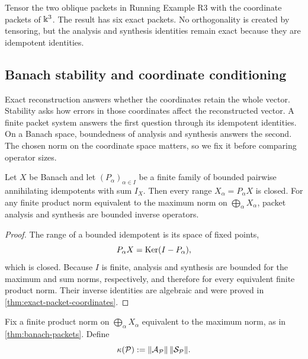 \begin{microexample}[title={Tensoring the oblique packet split}]
Tensor the two oblique packets in Running Example R3 with the coordinate packets of \(\Bbbk^3\).  The result has six exact packets.  No orthogonality is created by tensoring, but the analysis and synthesis identities remain exact because they are idempotent identities.
\end{microexample}

\subsection{Banach stability and coordinate conditioning}
Exact reconstruction answers whether the coordinates retain the whole vector.  Stability asks how errors in those coordinates affect the reconstructed vector.  A finite packet system answers the first question through its idempotent identities.  On a Banach space, boundedness of analysis and synthesis answers the second.  The chosen norm on the coordinate space matters, so we fix it before comparing operator sizes.

\begin{theorem}
\label{thm:banach-packets}
Let $X$ be Banach and let $(P_\alpha)_{\alpha\in I}$ be a finite family of bounded pairwise annihilating idempotents with sum $I_X$.  Then every range $X_\alpha=P_\alpha X$ is closed.  For any finite product norm equivalent to the maximum norm on $\bigoplus_\alpha X_\alpha$, packet analysis and synthesis are bounded inverse operators.
\end{theorem}

\begin{proof}
The range of a bounded idempotent is its space of fixed points,
\[
P_\alpha X=\operatorname{Ker}(I-P_\alpha),
\]
which is closed.  Because $I$ is finite, analysis and synthesis are bounded for the maximum and sum norms, respectively, and therefore for every equivalent finite product norm.  Their inverse identities are algebraic and were proved in \cref{thm:exact-packet-coordinates}.
\end{proof}

\begin{definition}
\label{def:packet-condition-number}
Fix a finite product norm on $\bigoplus_\alpha X_\alpha$ equivalent to the maximum norm, as in \cref{thm:banach-packets}. Define
\[
\kappa(\mathcal P):=
\|\mathcal A_{\mathcal P}\|\,
\|\mathcal S_{\mathcal P}\|.
\]
\end{definition}

